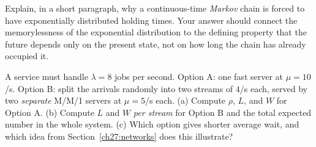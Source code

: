 \begin{exercise}
\label{ch27:exr-why-exp}
Explain, in a short paragraph, why a continuous-time \emph{Markov} chain is forced to have
exponentially distributed holding times. Your answer should connect the memorylessness of the
exponential distribution to the defining property that the future depends only on the present state,
not on how long the chain has already occupied it.
\end{exercise}

\begin{exercise}
\label{ch27:exr-pooling}
A service must handle $\lambda = 8$ jobs per second. Option A: one fast server at $\mu = 10$/s.
Option B: split the arrivals randomly into two streams of $4$/s each, served by two \emph{separate}
M/M/1 servers at $\mu = 5$/s each. (a) Compute $\rho$, $L$, and $W$ for Option A. (b) Compute $L$ and
$W$ \emph{per stream} for Option B and the total expected number in the whole system. (c) Which
option gives shorter average wait, and which idea from Section~\ref{ch27:networks} does this
illustrate?
\end{exercise}
